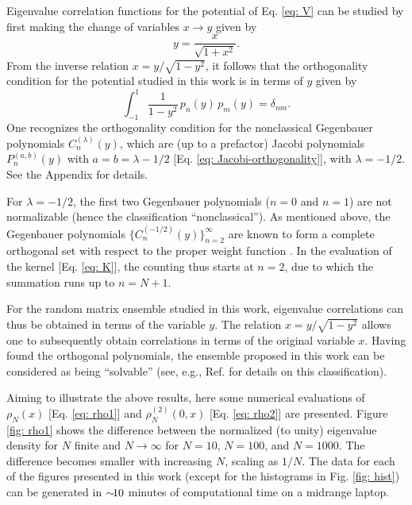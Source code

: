 \documentclass[aps, notitlepage, floatfix, pre, twocolumn]{revtex4-2}
\begin{document}
Eigenvalue correlation functions for the potential of Eq. \eqref{eq: V} can be studied by first making the change of variables $x \to y$ given by
\begin{equation}
y = \frac{x}{\sqrt{1 + x^2}}.
\label{eq: transformation}
\end{equation}
From the inverse relation $x = y / \sqrt{1 - y^2}$, it follows that the orthogonality condition for the potential studied in this work is in terms of $y$ given by
\begin{equation}
\int_{-1}^1 \frac{1}{1 - y^2} \, p_n(y) \, p_m(y) = \delta_{nm}.
\end{equation}
One recognizes the orthogonality condition for the nonclassical Gegenbauer polynomials $C_n^{(\lambda)}(y)$, which are (up to a prefactor) Jacobi polynomials $P_n^{(a, b)}(y)$ with $a = b = \lambda - 1/2$ [Eq. \eqref{eq: Jacobi-orthogonality}], with $\lambda = -1/2$. See the Appendix for details.

For $\lambda = -1/2$, the first two Gegenbauer polynomials ($n = 0$ and $n = 1$) are not normalizable (hence the classification ``nonclassical''). As mentioned above, the Gegenbauer polynomials $\{ C_n^{(-1/2)}(y) \}_{n=2}^\infty$ are known to form a complete orthogonal set with respect to the proper weight function \cite{Bruder14}. In the evaluation of the kernel [Eq. \eqref{eq: K}], the counting thus starts at $n=2$, due to which the summation runs up to $n = N+1$. 

For the random matrix ensemble studied in this work, eigenvalue correlations can thus be obtained in terms of the variable $y$. The relation $x = y / \sqrt{1 - y^2}$ allows one to subsequently obtain correlations in terms of the original variable $x$. Having found the orthogonal polynomials, the ensemble proposed in this work can be considered as being ``solvable'' (see, e.g., Ref. \cite{Muttalib93} for details on this classification).

Aiming to illustrate the above results, here some numerical evaluations of $\rho_N(x)$ [Eq. \eqref{eq: rho1}] and $\rho_N^{(2)}(0,x)$ [Eq. \eqref{eq: rho2}] are presented. Figure \ref{fig: rho1} shows the difference between the normalized (to unity) eigenvalue density for $N$ finite and $N \to \infty$ for $N = 10$, $N = 100$, and $N = 1000$. The difference becomes smaller with increasing $N$, scaling as $1/N$. The data for each of the figures presented in this work (except for the histograms in Fig. \ref{fig: hist}) can be generated in $\sim \hspace{-1.5mm} 10$ minutes of computational time on a midrange laptop.
\end{document}
